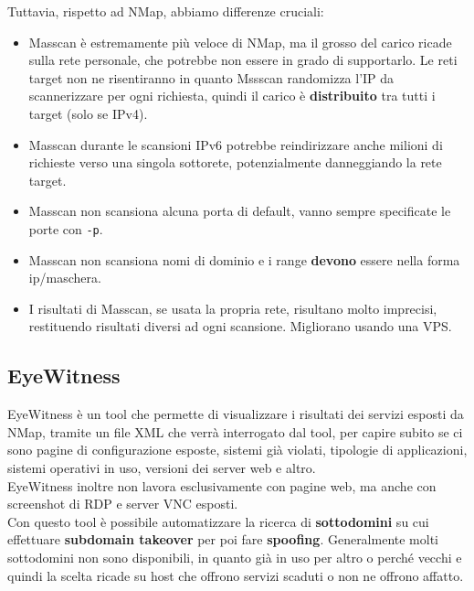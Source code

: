 \documentclass{article}
\begin{document}
Tuttavia, rispetto ad NMap, abbiamo differenze cruciali:
\begin{itemize}
    \item Masscan è estremamente più veloce di NMap, ma il grosso del carico ricade sulla rete personale, che potrebbe non essere in grado di supportarlo. Le reti target non ne risentiranno in quanto Mssscan randomizza l'IP da scannerizzare per ogni richiesta, quindi il carico è \textbf{distribuito} tra tutti i target (solo se IPv4).
    \item Masscan durante le scansioni IPv6 potrebbe reindirizzare anche milioni di richieste verso una singola sottorete, potenzialmente danneggiando la rete target.
    \item Masscan non scansiona alcuna porta di default, vanno sempre specificate le porte con \verb|-p|.
    \item Masscan non scansiona nomi di dominio e i range \textbf{devono} essere nella forma ip/maschera.
    \item I risultati di Masscan, se usata la propria rete, risultano molto imprecisi, restituendo risultati diversi ad ogni scansione. Migliorano usando una VPS.
\end{itemize}

\newpage 

\subsection{EyeWitness}
EyeWitness è un tool che permette di visualizzare i risultati dei servizi esposti da NMap, tramite un file XML che verrà interrogato dal tool, per capire subito se ci sono pagine di configurazione esposte, sistemi già violati, tipologie di applicazioni, sistemi operativi in uso, versioni dei server web e altro.\\
EyeWitness inoltre non lavora esclusivamente con pagine web, ma anche con screenshot di RDP e server VNC esposti.\\
Con questo tool è possibile automatizzare la ricerca di \textbf{sottodomini} su cui effettuare \textbf{subdomain takeover} per poi fare \textbf{spoofing}. Generalmente molti sottodomini non sono disponibili, in quanto già in uso per altro o perché vecchi e quindi la scelta ricade su host che offrono servizi scaduti o non ne offrono affatto.
\end{document}
